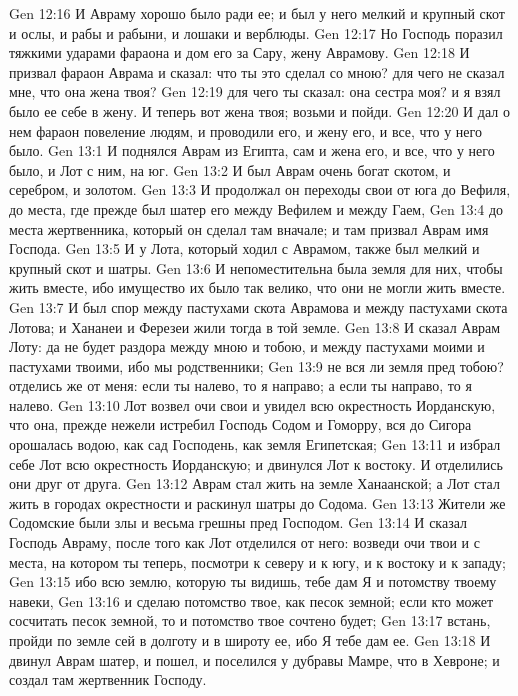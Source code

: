 Gen 12:16  И Авраму хорошо было ради ее; и был у него мелкий и крупный скот и ослы, и рабы и рабыни, и лошаки и верблюды.
Gen 12:17  Но Господь поразил тяжкими ударами фараона и дом его за Сару, жену Аврамову.
Gen 12:18  И призвал фараон Аврама и сказал: что ты это сделал со мною? для чего не сказал мне, что она жена твоя?
Gen 12:19  для чего ты сказал: она сестра моя? и я взял было ее себе в жену. И теперь вот жена твоя; возьми и пойди.
Gen 12:20  И дал о нем фараон повеление людям, и проводили его, и жену его, и все, что у него было.
Gen 13:1  И поднялся Аврам из Египта, сам и жена его, и все, что у него было, и Лот с ним, на юг.
Gen 13:2  И был Аврам очень богат скотом, и серебром, и золотом.
Gen 13:3  И продолжал он переходы свои от юга до Вефиля, до места, где прежде был шатер его между Вефилем и между Гаем,
Gen 13:4  до места жертвенника, который он сделал там вначале; и там призвал Аврам имя Господа.
Gen 13:5  И у Лота, который ходил с Аврамом, также был мелкий и крупный скот и шатры.
Gen 13:6  И непоместительна была земля для них, чтобы жить вместе, ибо имущество их было так велико, что они не могли жить вместе.
Gen 13:7  И был спор между пастухами скота Аврамова и между пастухами скота Лотова; и Хананеи и Ферезеи жили тогда в той земле.
Gen 13:8  И сказал Аврам Лоту: да не будет раздора между мною и тобою, и между пастухами моими и пастухами твоими, ибо мы родственники;
Gen 13:9  не вся ли земля пред тобою? отделись же от меня: если ты налево, то я направо; а если ты направо, то я налево.
Gen 13:10  Лот возвел очи свои и увидел всю окрестность Иорданскую, что она, прежде нежели истребил Господь Содом и Гоморру, вся до Сигора орошалась водою, как сад Господень, как земля Египетская;
Gen 13:11  и избрал себе Лот всю окрестность Иорданскую; и двинулся Лот к востоку. И отделились они друг от друга.
Gen 13:12  Аврам стал жить на земле Ханаанской; а Лот стал жить в городах окрестности и раскинул шатры до Содома.
Gen 13:13  Жители же Содомские были злы и весьма грешны пред Господом.
Gen 13:14  И сказал Господь Авраму, после того как Лот отделился от него: возведи очи твои и с места, на котором ты теперь, посмотри к северу и к югу, и к востоку и к западу;
Gen 13:15  ибо всю землю, которую ты видишь, тебе дам Я и потомству твоему навеки,
Gen 13:16  и сделаю потомство твое, как песок земной; если кто может сосчитать песок земной, то и потомство твое сочтено будет;
Gen 13:17  встань, пройди по земле сей в долготу и в широту ее, ибо Я тебе дам ее.
Gen 13:18  И двинул Аврам шатер, и пошел, и поселился у дубравы Мамре, что в Хевроне; и создал там жертвенник Господу.
